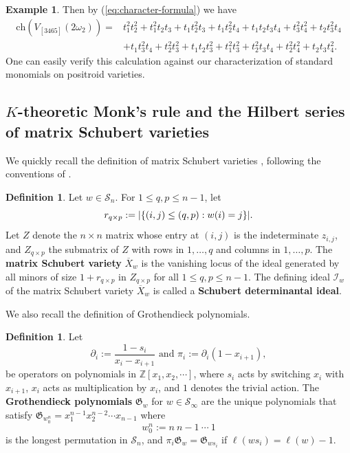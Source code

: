 \documentclass[12pt,reqno]{amsart}
\theoremstyle{definition}
\newtheorem{definition}[lemma]{Definition}
\newtheorem{example}[lemma]{Example}
\newcommand{\cI}{\mathcal{I}}
\newcommand{\ZZ}{\mathbb{Z}}
\DeclarePairedDelimiter\abs{\lvert}{\rvert}%
\def\ZZ{{\mathbb Z}}
\newcommand{\ch}{\mathrm{ch}}
\newcommand{\symm}{\mathcal{S}}
\begin{document}
{\begin{example}
    Then by (\ref{eq:character-formula}) we have 
    \begin{align*}
    \ch(V_{[3465]}(2\omega_2)) = &t_1^2t_2^2+t_1^2t_2t_3+t_1t_2^2t_3+t_1t_2^2t_4 +t_1t_2t_3t_4+t_3^2t_4^2+t_2t_3^2t_4\\
    &+t_1t_3^2t_4+t_2^2t_3^2+t_1t_2t_3^2+t_1^2t_3^2+t_2^2t_3t_4+t_2^2t_4^2+t_2t_3t_4^2.      
    \end{align*}
  One can easily verify this calculation against our characterization of standard monomials on positroid varieties.
\end{example}

 \subsection{\texorpdfstring{$K$}{K}-theoretic Monk's rule and the Hilbert series of matrix Schubert varieties}
 \label{subsec:msv}
 
We quickly recall the definition of matrix Schubert varieties \cite{Fulton92}, following the conventions of \cite{knutsonMiller}.

\begin{definition}
    Let $w\in \symm_n$. For $1\le q,p \le n-1$, let \[r_{q\times p}:=\abs{\{(i,j)\le (q,p): w(i)=j\}}.\]
    Let $Z$ denote the $n\times n$ matrix whose entry at $(i,j)$ is the indeterminate $z_{i,j}$, and $Z_{q\times p}$ the submatrix of $Z$ with rows in $1,\ldots,q$ and columns in $1,\ldots, p$. The \textbf{matrix Schubert variety} $\overline{X}_w$ is the vanishing locus of the ideal generated by all minors of size $1+r_{q\times p}$ in $Z_{q\times p}$ for all $1\le q,p \le n-1$. The defining ideal $\cI_w$ of the matrix Schubert variety $\overline{X}_w$ is called a \textbf{Schubert determinantal ideal}.
\end{definition}

We also recall the definition of Grothendieck polynomials. 
\begin{definition}
\label{def:grothendieck}
    Let \[\partial_i:=\frac{1-s_i}{x_i-x_{i+1}}\text{ and }\pi_i:= \partial_i(1-x_{i+1}),\]
be operators on polynomials in $\ZZ[x_1,x_2,\cdots]$, where $s_i$ acts by switching $x_i$ with $x_{i+1}$, $x_i$ acts as multiplication by $x_i$, and $1$ denotes the trivial action. 
The \textbf{Grothendieck polynomials} $\mathfrak{G}_w$ for $w\in \symm_\infty$ are the unique polynomials that satisfy
$\mathfrak{G}_{w_0^n}=x_1^{n-1}x_2^{n-2}\cdots x_{n-1}$ where
\[w_0^n:=n\ n-1 \ \cdots \ 1\]
is the longest permutation in $\symm_n$,
and $\pi_i\mathfrak{G}_w=\mathfrak{G}_{ws_i}$ if $\ell(ws_i)=\ell(w)-1$.
\end{definition}

}
\end{document}
